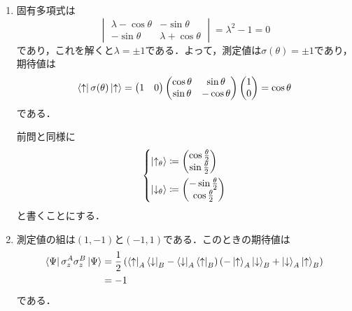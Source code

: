 \documentclass[a4paper,pdflatex,ja=standard]{bxjsarticle}
\begin{document}
\begin{enumerate}
  \item 
  固有多項式は
  \begin{equation}
    \begin{vmatrix}
      \lambda -\cos\theta & -\sin\theta \\
      -\sin\theta & \lambda + \cos\theta
    \end{vmatrix}
    =
    \lambda^2 -1=0
  \end{equation}
  であり，これを解くと$\lambda=\pm 1$である．よって，測定値は$\sigma(\theta)=\pm 1$であり，期待値は
  \begin{equation}
    \bra{\uparrow}\sigma(\theta)\ket{\uparrow}
    =
    \begin{pmatrix}
      1 & 0
    \end{pmatrix}
    \begin{pmatrix}
      \cos\theta & \sin\theta \\
      \sin\theta & -\cos\theta
    \end{pmatrix}
    \begin{pmatrix}
      1 \\
      0
    \end{pmatrix}
    =
    \cos\theta
  \end{equation}
  である．

  前問と同様に
  \begin{equation}
    \begin{dcases}
      \ket{\uparrow_{\theta}}
      \coloneqq
      \begin{pmatrix}
        \cos\tfrac{\theta}{2} \\
        \sin\tfrac{\theta}{2}
      \end{pmatrix}
      \\
      \ket{\downarrow_{\theta}}
      \coloneqq
      \begin{pmatrix}
        -\sin\tfrac{\theta}{2} \\
        \cos\tfrac{\theta}{2}
      \end{pmatrix}
    \end{dcases}
    \label{theta_basis}
  \end{equation}
  と書くことにする．

  \item 
  測定値の組は$(1,-1)$と$(-1,1)$である．このときの期待値は
  \begin{align}
    \bra{\Psi}\sigma_{z}^{A}\sigma_{z}^{B}\ket{\Psi}
    &=
    \frac{1}{2}\left( \bra{\uparrow}_{A}\bra{\downarrow}_{B}-\bra{\downarrow}_{A}\bra{\uparrow}_{B}  \right)
    \left( -\ket{\uparrow}_{A}\ket{\downarrow}_{B}+\ket{\downarrow}_{A}\ket{\uparrow}_{B}  \right)
    \nonumber
    \\
    &=
    -1
  \end{align}
  である．


\end{enumerate}
\end{document}

